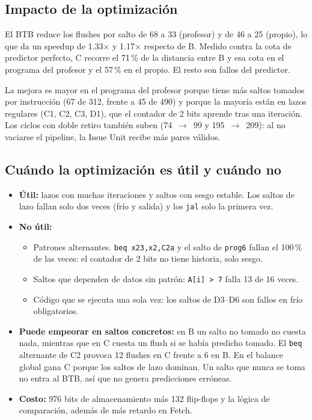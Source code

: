 \documentclass[11pt,a4paper]{article}
\newcommand{\sig}[1]{\texttt{#1}}
\begin{document}
\subsection{Impacto de la optimización}

El BTB reduce los flushes por salto de 68 a 33 (profesor) y de 46 a 25 (propio), lo que da un speedup de 1.33$\times$ y 1.17$\times$ respecto de B. Medido contra la cota de predictor perfecto, C recorre el 71\,\% de la distancia entre B y esa cota en el programa del profesor y el 57\,\% en el propio. El resto son fallos del predictor.

La mejora es mayor en el programa del profesor porque tiene más saltos tomados por instrucción (67 de 312, frente a 45 de 490) y porque la mayoría están en lazos regulares (C1, C2, C3, D1), que el contador de 2 bits aprende tras una iteración. Los ciclos con doble retiro también suben (74~$\rightarrow$~99 y 195~$\rightarrow$~209): al no vaciarse el pipeline, la Issue Unit recibe más pares válidos.

\subsection{Cuándo la optimización es útil y cuándo no}

\begin{itemize}[nosep]
  \item \textbf{Útil:} lazos con muchas iteraciones y saltos con sesgo estable. Los saltos de lazo fallan solo dos veces (frío y salida) y los \sig{jal} solo la primera vez.
  \item \textbf{No útil:}
    \begin{itemize}[nosep]
      \item Patrones alternantes. \sig{beq x23,x2,C2a} y el salto de \sig{prog6} fallan el 100\,\% de las veces: el contador de 2 bits no tiene historia, solo sesgo.
      \item Saltos que dependen de datos sin patrón: \sig{A[i]~>~7} falla 13 de 16 veces.
      \item Código que se ejecuta una sola vez: los saltos de D3–D6 son fallos en frío obligatorios.
    \end{itemize}
  \item \textbf{Puede empeorar en saltos concretos:} en B un salto no tomado no cuesta nada, mientras que en C cuesta un flush si se había predicho tomado. El \sig{beq} alternante de C2 provoca 12 flushes en C frente a 6 en B. En el balance global gana C porque los saltos de lazo dominan. Un salto que nunca se toma no entra al BTB, así que no genera predicciones erróneas.
  \item \textbf{Costo:} 976 bits de almacenamiento más 132 flip-flops y la lógica de comparación, además de más retardo en Fetch.
\end{itemize}
\end{document}
